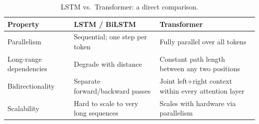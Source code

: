 \begin{table}[H]
\centering
\caption{LSTM vs.\ Transformer: a direct comparison.}
\label{tab:lstm_vs_transformer}
\begin{tabularx}{0.92\textwidth}{lXX}
  \toprule
  \textbf{Property} & \textbf{LSTM / BiLSTM} & \textbf{Transformer} \\
  \midrule
  Parallelism
    & Sequential; one step per token
    & Fully parallel over all tokens \\
  Long-range dependencies
    & Degrade with distance
    & Constant path length between any two positions \\
  Bidirectionality
    & Separate forward/backward passes
    & Joint left+right context within every attention layer \\
  Scalability
    & Hard to scale to very long sequences
    & Scales with hardware via parallelism \\
  \bottomrule
\end{tabularx}
\end{table}
